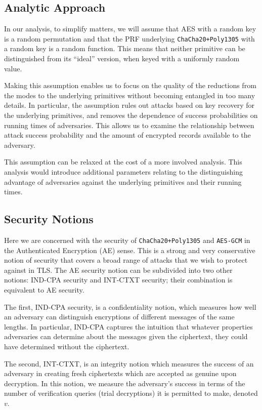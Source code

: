 \documentclass{article}
\begin{document}
\subsection{Analytic Approach}
In our analysis, to simplify matters, we will assume that AES with a random key is a random permutation and that the PRF underlying \texttt{ChaCha20+Poly1305} with a random key is a random function. This means that neither primitive can be distinguished from its ``ideal'' version, when keyed with a uniformly random value. %

Making this assumption enables us to focus on the quality of the reductions from the modes to the underlying primitives without becoming entangled in too many details. In particular, the assumption rules out attacks based on key recovery for the underlying primitives, and removes the dependence of success probabilities on running times of adversaries. This allows us to examine the relationship between attack success probability and the amount of encrypted records available to the adversary.

This assumption can be relaxed at the cost of a more involved analysis. This analysis would introduce additional parameters relating to the distinguishing advantage of adversaries against the underlying primitives and their running times. 

\subsection{Security Notions}

Here we are concerned with the security of \texttt{ChaCha20+Poly1305} and  \texttt{AES-GCM} in the Authenticated Encryption (AE) sense. This is a strong and very conservative notion of security that covers a broad range of attacks that we wish to protect against in TLS. The AE security notion can be subdivided into two other notions: IND-CPA security and INT-CTXT security; their combination is equivalent to AE security.

The first, IND-CPA security, is a confidentiality notion, which measures how well an adversary can distinguish encryptions of different messages of the same lengths. In particular, IND-CPA captures the intuition that whatever properties adversaries can determine about the messages given the ciphertext, they could have determined without the ciphertext.

The second, INT-CTXT, is an integrity notion which measures the success of an adversary in creating fresh ciphertexts which are accepted as genuine upon decryption. In this notion, we measure the adversary's success in terms of the number of verification queries (trial decryptions) it is permitted to make, denoted $v$. 
\end{document}
